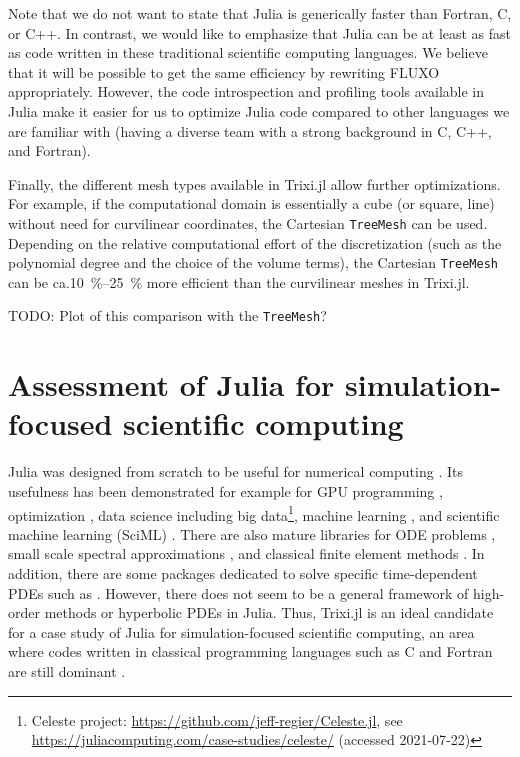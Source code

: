 \documentclass{juliacon}
\makeatletter
\newcommand{\ca}[0]{{ca.\@}\xspace}
\newcommand{\trixi}{Trixi.jl\xspace}
\newcommand{\todo}[1]{{\color{red}#1}}
\makeatother
\begin{document}
Note that we do not want to state that Julia is generically faster than Fortran,
C, or C++. In contrast, we would like to emphasize that Julia can be at least
as fast as code written in these traditional scientific computing languages.
We believe that it will be possible to get the same efficiency by rewriting
FLUXO appropriately. However, the code introspection and profiling tools available
in Julia make it easier for us to optimize Julia code compared to other languages
we are familiar with (having a diverse team with a strong background in C, C++,
and Fortran).

Finally, the different mesh types available in \trixi allow further optimizations.
For example, if the computational domain is essentially a cube (or square, line)
without need for curvilinear coordinates, the Cartesian \lstinline{TreeMesh} can
be used. Depending on the relative computational effort of the discretization
(such as the polynomial degree and the choice of the volume terms), the
Cartesian \lstinline{TreeMesh} can be \ca \SI{10}{\percent}--\SI{25}{\percent}
more efficient than the curvilinear meshes in \trixi.

\todo{TODO: Plot of this comparison with the \lstinline{TreeMesh}?}



\section{Assessment of Julia for simulation-focused scientific computing}

Julia was designed from scratch to be useful for numerical computing
\cite{bezanson2017julia}. Its usefulness has been demonstrated for example for
GPU programming \cite{besard2018juliagpu, omlin2020solving},
optimization \cite{dunning2017jump}, data science including
big data\footnote{Celeste project: \url{https://github.com/jeff-regier/Celeste.jl},
see \url{https://juliacomputing.com/case-studies/celeste/} (accessed 2021-07-22)},
machine learning \cite{innes2018fashionable}, and scientific machine learning
(SciML) \cite{pal2021opening}. There are also mature libraries for ODE problems
\cite{rackauckas2017differentialequations}, small scale spectral approximations
\cite{olver2014practical}, and classical finite element methods \cite{badia2020gridap}.
In addition, there are some packages dedicated to solve specific time-dependent
PDEs such as \cite{ramadhan2020oceananigans, constantinou2021geophysicalflows}.
However, there does not seem to be a general framework of high-order methods
or hyperbolic PDEs in Julia. Thus, \trixi is an ideal candidate for a case study
of Julia for simulation-focused scientific computing, an area where codes written
in classical programming languages such as C and Fortran are still dominant
\cite{krais2021flexi, parsani2021ssdc}.
\end{document}
